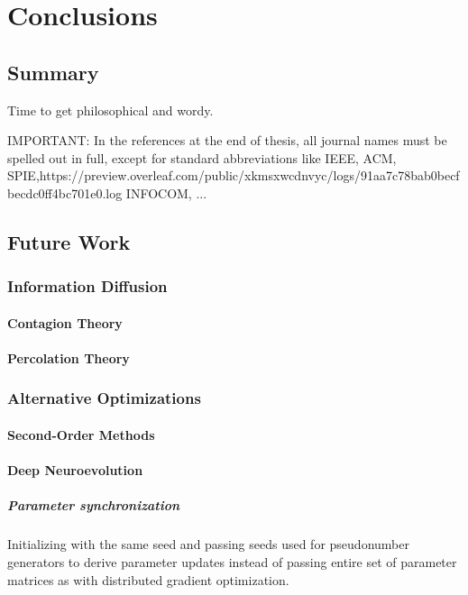 \chapter{Conclusions}
\label{chapter:Conclusions}
\thispagestyle{myheadings}

\graphicspath{{3_Conclusion/Figures/}}

\section{Summary}

Time to get philosophical and wordy.

IMPORTANT: In the references at the end of thesis, all journal names must be
spelled out in full, except for standard abbreviations like IEEE, ACM, SPIE,https://preview.overleaf.com/public/xkmsxwcdnvyc/logs/91aa7c78bab0becfbecdc0ff4bc701e0.log
INFOCOM, ...

\section{Future Work}
\subsection{Information Diffusion}
\subsubsection{Contagion Theory}
\subsubsection{Percolation Theory}
\subsection{Alternative Optimizations}
\subsubsection{Second-Order Methods}
\cite{ba2016distributed}
\subsubsection{Deep Neuroevolution}
\paragraph{Parameter synchronization}
\noindent Initializing with the same seed and passing seeds used for pseudonumber generators to derive parameter updates instead of passing entire set of parameter matrices as with distributed gradient optimization. \cite{such2017deep}
